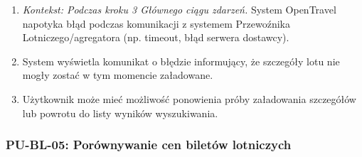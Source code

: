 \documentclass[a4paper,12pt]{article}
\begin{document}
\begin{itemize}
\begin{itemize}
\begin{enumerate}
                    \item \textit{Kontekst: Podczas kroku 3 Głównego ciągu zdarzeń.} System OpenTravel napotyka błąd podczas komunikacji z systemem Przewoźnika Lotniczego/agregatora (np. timeout, błąd serwera dostawcy).
                    \item System wyświetla komunikat o błędzie informujący, że szczegóły lotu nie mogły zostać w tym momencie załadowane.
                    \item Użytkownik może mieć możliwość ponowienia próby załadowania szczegółów lub powrotu do listy wyników wyszukiwania.
                \end{enumerate}
        \end{itemize}
\end{itemize}

\subsubsection{PU-BL-05: Porównywanie cen biletów lotniczych}
\end{document}
